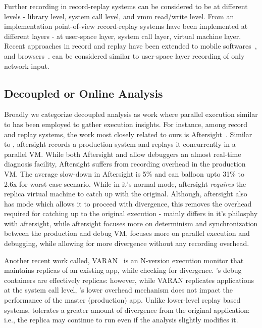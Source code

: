 Further recording in record-replay systems can be considered to be at different levels - library level, system call level, and vmm read/write level. 
From an implementation point-of-view record-replay systems have been implemented at different layers - at user-space layer, system call layer, virtual machine layer.
Recent approaches in record and replay have been extended to mobile softwares~\cite{mobileReplay,MobiPlay}, and browsers~\cite{browserReplay}.
\parikshan can be considered similar to user-space layer recording of only network input.


\subsection{Decoupled or Online Analysis}
\label{sec:relatedDecoupled}

Broadly we categorize decoupled analysis as work where parallel execution similar to \parikshan has been employed to gather execution insights.
For instance, among record and replay systems, the work most closely related to ours is Aftersight~\cite{aftersight}. 
Similar to \parikshan, aftersight records a production system and replays it concurrently in a parallel VM.
While both Aftersight and \parikshan allow debuggers an almost real-time diagnosis facility, Aftersight suffers from recording overhead in the production VM.
The average slow-down in Aftersight is 5\% and can balloon upto 31\% to 2.6x for worst-case scenario.
While in it's normal mode, aftersight \emph{requires} the replica virtual machine to catch up with the original.
Although, aftersight also has mode which allows it to proceed with divergence, this removes the overhead required for catching up to the original execution - \parikshan mainly differs in it's philosphy with aftersight, while aftersight focuses more on determinism and synchronization between the production and debug VM, \parikshan focuses more on parallel execution and debugging, while allowing for more divergence without any recording overhead.


Another recent work called, VARAN~\cite{Hosek:2015:VUE:2694344.2694390} is an N-version execution monitor that maintains replicas of an existing app, while checking for divergence.
\parikshan's debug containers are effectively replicas: however, while VARAN replicates applications at the system call level, \parikshan's lower overhead mechanism does not impact the performance of the master (production) app.
Unlike lower-level replay based systems, \parikshan tolerates a greater amount of divergence from the original application: i.e., the replica may continue to run even if the analysis slightly modifies it.

